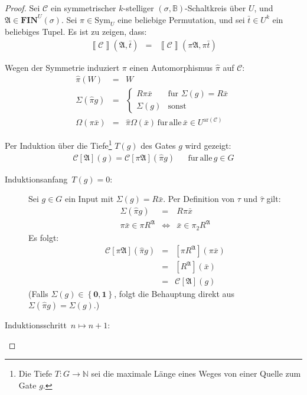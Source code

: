 \begin{proof}
Sei $\mathcal{C}$ ein symmetrischer $k$-stelliger $\left(\sigma,\mathbb{B}\right)$-Schaltkreis
über $U$, und $\mathfrak{A}\in\mathbf{FIN}^{U}\left(\sigma\right)$.
Sei $\pi\in\mathrm{Sym}_{U}$ eine beliebige Permutation, und sei
$\bar{t}\in U^{k}$ ein beliebiges Tupel. Es ist zu zeigen, dass:
\begin{eqnarray*}
\left\llbracket \mathcal{C}\right\rrbracket \left(\mathfrak{A},\bar{t}\right) & = & \left\llbracket \mathcal{C}\right\rrbracket \left(\pi\mathfrak{A},\pi\bar{t}\right)
\end{eqnarray*}

Wegen der Symmetrie induziert $\pi$ einen Automorphismus $\hat{\pi}$
auf $\mathcal{C}$: 
\begin{eqnarray*}
\hat{\pi}\left(W\right) & = & W\\
\Sigma\left(\hat{\pi}g\right) & = & \begin{cases}
R\pi\bar{x} & \mathrm{f\ddot{u}r}\,\,\Sigma\left(g\right)=R\bar{x}\\
\Sigma\left(g\right) & \mathrm{sonst}
\end{cases}\\
\Omega\left(\pi\bar{x}\right) & = & \hat{\pi}\Omega\left(\bar{x}\right)\,\mathrm{f\ddot{u}r\,alle}\,\bar{x}\in U^{\mathrm{ar}\left(\mathcal{C}\right)}
\end{eqnarray*}

Per Induktion über die Tiefe\footnote{Die Tiefe $T:G\rightarrow\mathbb{N}$ sei die maximale Länge eines
Weges von einer Quelle zum Gate $g$.} $T\left(g\right)$ des Gates $g$ wird gezeigt: 
\begin{eqnarray*}
\mathcal{C}\left[\mathfrak{A}\right]\left(g\right)=\mathcal{C}\left[\pi\mathfrak{A}\right]\left(\hat{\pi}g\right) &  & \mathrm{f\ddot{u}r\,alle}\,g\in G
\end{eqnarray*}

\begin{description}
\item [{Induktionsanfang~$T\left(g\right)=0$:}] Sei $g\in G$ ein Input
mit $\Sigma\left(g\right)=R\bar{x}$. Per Definition von $\tau$ und
$\hat{\tau}$ gilt:
\begin{eqnarray*}
\Sigma\left(\hat{\pi}g\right) & = & R\pi\bar{x}\\
\pi\bar{x}\in\pi R^{\mathfrak{A}} & \Longleftrightarrow & \bar{x}\in\pi_{2}R^{\mathfrak{A}}
\end{eqnarray*}
 Es folgt: 
\begin{eqnarray*}
\mathcal{C}\left[\pi\mathfrak{A}\right]\left(\hat{\pi}g\right) & = & \left[\pi R^{\mathfrak{A}}\right]\left(\pi\bar{x}\right)\\
 & = & \left[R^{\mathfrak{A}}\right]\left(\bar{x}\right)\\
 & = & \mathcal{C}\left[\mathfrak{A}\right]\left(g\right)
\end{eqnarray*}
(Falls $\Sigma\left(g\right)\in\left\{ \mathbf{0},\mathbf{1}\right\} $,
folgt die Behauptung direkt aus $\Sigma\left(\hat{\pi}g\right)=\Sigma\left(g\right)$.)
\item [{Induktionsschritt~$n\mapsto n+1$:}] 


\end{description}
\end{proof}
